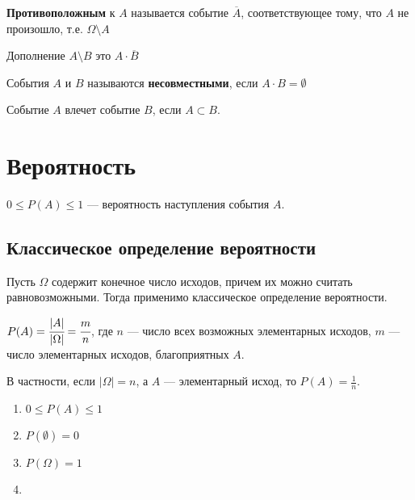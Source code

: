 \documentclass[12pt, a4paper, oneside]{book}
\begin{document}
\begin{definition}
    \textbf{Противоположным} к \(A\) называется событие \(\overline A\), соответствующее тому, что \(A\) не произошло, т.е. \(\Omega\setminus A\)
\end{definition}

\begin{definition}
    Дополнение \(A\setminus B\) это \(A\cdot \overline B\)
\end{definition}

\begin{definition}
    События \(A\) и \(B\) называются \textbf{несовместными}, если \(A\cdot B = \emptyset\)
\end{definition}

\begin{definition}
    Событие \(A\) влечет событие \(B\), если \(A\subset B\).
\end{definition}

\section{Вероятность}

\begin{definition}
    \(0 \leq P(A) \leq 1\) --- вероятность наступления события \(A\).
\end{definition}

\subsection{Классическое определение вероятности}

Пусть \(\Omega\) содержит конечное число исходов, причем их можно считать равновозможными. Тогда применимо классическое определение вероятности.

\(P(A) = \cfrac{|A|}{|\Omega|} = \cfrac{m}{n}\), где \(n\) --- число всех возможных элементарных исходов, \(m\) --- число элементарных исходов, благоприятных \(A\).

В частности, если \(|\Omega|= n\), а \(A\) --- элементарный исход, то \(P(A) = \frac{1}{n}\).

\begin{prop}\itemfix
    \begin{enumerate}
        \item \(0 \leq P(A) \leq 1\)
        \item \(P(\emptyset) = 0\)
        \item \(P(\Omega) = 1\)
        \item \? %
    \end{enumerate}
\end{prop}
\end{document}
